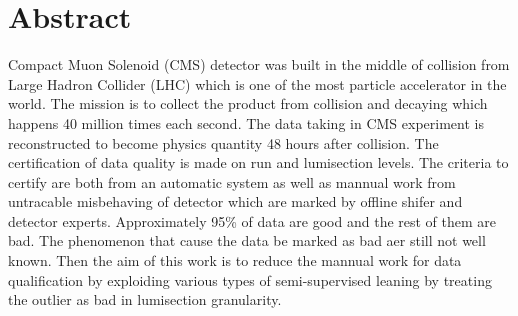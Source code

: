\chapter*{\Large \center Abstract}


Compact Muon Solenoid (CMS) detector was built in the middle of collision from Large Hadron Collider (LHC) which is one of the most particle accelerator in the world. The mission is to collect the product from collision and decaying which happens 40 million times each second.
The data taking in CMS experiment is reconstructed to become physics quantity 48 hours after collision. The certification of data quality is made on run and lumisection levels. The criteria to certify are both from an automatic system as well as mannual work from untracable misbehaving of detector which are marked by offline shifer and detector experts.
Approximately 95\% of data are good and the rest of them are bad. The phenomenon that cause the data be marked as bad aer still not well known.
Then the aim of this work is to reduce the mannual work for data qualification by exploiding various types of semi-supervised leaning by treating the outlier as bad in lumisection granularity.